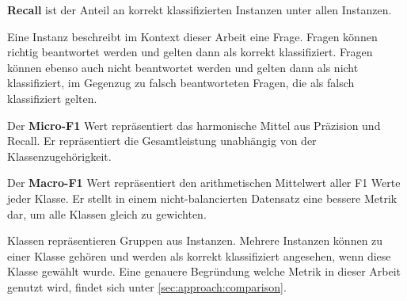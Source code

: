 \begin{definition}
    \textbf{Recall} ist der Anteil an korrekt klassifizierten Instanzen unter allen Instanzen.
\end{definition}
Eine Instanz beschreibt im Kontext dieser Arbeit eine Frage. Fragen können richtig beantwortet werden und gelten dann als korrekt klassifiziert.
Fragen können ebenso auch nicht beantwortet werden und gelten dann als nicht klassifiziert, im Gegenzug zu falsch beantworteten Fragen, die als falsch klassifiziert gelten.\\

\begin{definition}\label{def:micro-f1}
    Der \textbf{Micro-F1} Wert repräsentiert das harmonische Mittel aus Präzision und Recall.
    Er repräsentiert die Gesamtleistung unabhängig von der Klassenzugehörigkeit.
\end{definition}

\begin{definition}\label{def:macro-f1}
    Der \textbf{Macro-F1} Wert repräsentiert den arithmetischen Mittelwert aller F1 Werte jeder Klasse.
    Er stellt in einem nicht-balancierten Datensatz eine bessere Metrik dar, um alle Klassen gleich zu gewichten.
\end{definition}

Klassen repräsentieren Gruppen aus Instanzen. Mehrere Instanzen können zu einer Klasse gehören und werden als korrekt klassifiziert angesehen, wenn diese Klasse gewählt wurde.
Eine genauere Begründung welche Metrik in dieser Arbeit genutzt wird, findet sich unter \cref{sec:approach:comparison}.
